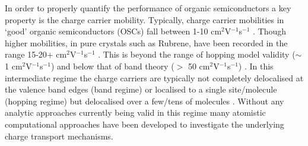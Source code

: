 In order to properly quantify the performance of organic semiconductors a key property is the charge carrier mobility. Typically, charge carrier mobilities in `good' organic semiconductors (OSCs) fall between 1-10 cm$^2$V$^{-1}$s$^{-1}$ \cite{Brown2018Mar}. Though higher mobilities, in pure crystals such as Rubrene, have been recorded in the range 15-20+ cm$^2$V$^{-1}$s$^{-1}$ \cite{Zimmerling_RubMob, Podzorov_Rubrene}. This is beyond the range of hopping model validity ($\sim$1 cm$^2$V$^{-1}$s$^{-1}$) and below that of band theory ($>$ 50 cm$^2$V$^{-1}$s$^{-1}$) \cite{yavuz_dichotomy_2017}. In this intermediate regime the charge carriers are typically not completely delocalised at the valence band edges (band regime) or localised to a single site/molecule (hopping regime) but delocalised over a few/tens of molecules \cite{giannini_crossover_2018}. Without any analytic approaches currently being valid in this regime many atomistic computational approaches have been developed to investigate the underlying charge transport mechanisms\cite{oberhofer_charge_2017}.
\\\\
